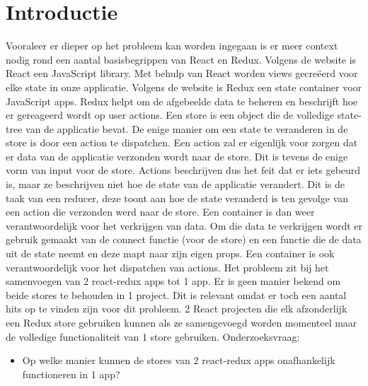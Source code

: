
\section{Introductie} %
\label{sec:introductie}
Vooraleer er dieper op het probleem kan worden ingegaan is er meer context nodig rond een aantal basisbegrippen van React en Redux.
Volgens de website \textcite{React01} is
React een JavaScript library. Met behulp van React worden views gecreëerd voor elke state in onze applicatie. 
Volgens de website \textcite{Redux02} is 
Redux een state container voor JavaScript apps. Redux helpt om de afgebeelde data te beheren en beschrijft hoe er gereageerd wordt op user actions.  
Een store is een object die de volledige state-tree van de applicatie bevat. De enige manier om een state te veranderen in de store is door een action te dispatchen.
Een action zal er eigenlijk voor zorgen dat er data van de applicatie verzonden wordt naar de store. Dit is tevens de enige vorm van input voor de store. Actions beschrijven dus het feit dat er iets gebeurd is, maar ze beschrijven niet hoe de state van de applicatie verandert. Dit is de taak van een reducer, deze toont aan hoe de state veranderd is ten gevolge van een action die verzonden werd naar de store. Een container is dan weer verantwoordelijk voor het verkrijgen van data. Om die data te verkrijgen wordt er gebruik gemaakt van de connect functie (voor de store) en een functie die de data uit de state neemt en deze mapt naar zijn eigen props. Een container is ook verantwoordelijk voor het dispatchen van actions. \autocite{Redux02} 
Het probleem zit bij het samenvoegen van 2 react-redux apps tot 1 app. Er is geen manier bekend om beide stores te behouden in 1 project. Dit is relevant omdat er toch een aantal hits op \textcite{SO01} te vinden zijn voor dit probleem. 
2 React projecten die elk afzonderlijk een Redux store gebruiken kunnen als ze samengevoegd worden momenteel maar de volledige functionaliteit van 1 store gebruiken.  
Onderzoeksvraag: 


\begin{itemize}
	\item Op welke manier kunnen de stores van 2 react-redux apps onafhankelijk functioneren in 1 app? 
	
\end{itemize}



